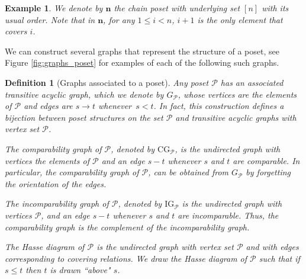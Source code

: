 \documentclass[9pt,a4paper,oneside]{article}
\newtheorem{example}[theorem]{Example}
\newtheorem{definition}[theorem]{Definition}
\newcommand{\cP}{\mathcal{P}}
\newcommand{\bn}{\mathbf{n}}
\newcommand{\CG}{\mathrm{CG}}
\newcommand{\IG}{\mathrm{IG}}
\begin{document}
\begin{example}
We denote by $\bn$ the chain poset with underlying set $[n]$ with its usual order.  Note that in $\bn$, for any $1\leq i < n$, $i+1$ is the only element that covers $i$.
\end{example}


We can construct several graphs that represent the structure of a poset, see Figure \ref{fig:graphs_poset} for examples of each of the following such graphs.  

\begin{definition}[Graphs associated to a poset]
Any poset $\cP$ has an associated transitive acyclic graph, which we denote by $G_\cP$, 
whose vertices are the elements of $\cP$ and  edges are $s \to t$ whenever~$s< t$.  
In fact, this construction defines a bijection between poset structures on the set $\cP$ and transitive acyclic graphs with vertex set $\cP$.  

The \emph{comparability graph} of $\cP$, denoted by $\CG_\cP$, is the undirected graph with vertices the elements of $\cP$ and an edge $s-t$ whenever $s$ and $t$ are comparable.  In particular, the comparability graph of $\cP$, can be obtained from $G_\cP$ by forgetting the orientation of the edges.
 
The \emph{incomparability graph} of $\cP$, denoted by $\IG_\cP$ is the undirected graph with vertices $\cP$, and an edge $s-t$ whenever $s$ and $t$ are incomparable. 
Thus, the comparability graph is the complement of the incomparability graph.

The \emph{Hasse diagram} of $\cP$ is the undirected graph with vertex set $\cP$ and with edges corresponding to covering relations.  We draw the Hasse diagram of $\cP$ such that if $s\leq t$ then $t$ is drawn ``above" $s$.


\end{definition}
\end{document}

